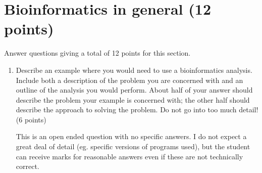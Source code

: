 \documentclass[11pt]{article}
\begin{document}
\section{Bioinformatics in general (12 points)}
Answer questions giving a total of 12 points for this section.
\begin{enumerate}
\item Describe an example where you would need to use a bioinformatics
  analysis. Include both a description of the problem you are concerned with
  and an outline of the analysis you would perform. About half of your answer
  should describe the problem your example is concerned with; the other half
  should describe the approach to solving the problem. Do not go into too much
  detail!\\
  (6 points)\\
\begin{Notes}
  This is an open ended question with no specific answers. I do not expect a
  great deal of detail (eg. specific versions of programs used), but the
  student can receive marks for reasonable answers even if these are not
  technically correct.
\end{Notes}


\end{enumerate}
\end{document}
